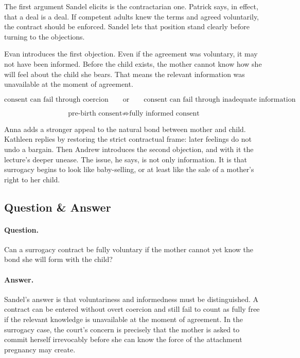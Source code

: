 The first argument Sandel elicits is the contractarian one. Patrick says, in effect, that a deal is a deal. If competent adults knew the terms and agreed voluntarily, the contract should be enforced. Sandel lets that position stand clearly before turning to the objections.

Evan introduces the first objection. Even if the agreement was voluntary, it may not have been informed. Before the child exists, the mother cannot know how she will feel about the child she bears. That means the relevant information was unavailable at the moment of agreement.

\begin{equation}
\text{consent can fail through coercion}
\qquad \text{or} \qquad
\text{consent can fail through inadequate information}
\end{equation}

\begin{equation}
\text{pre-birth consent} \not\Rightarrow \text{fully informed consent}
\end{equation}

Anna adds a stronger appeal to the natural bond between mother and child. Kathleen replies by restoring the strict contractual frame: later feelings do not undo a bargain. Then Andrew introduces the second objection, and with it the lecture's deeper unease. The issue, he says, is not only information. It is that surrogacy begins to look like baby-selling, or at least like the sale of a mother's right to her child.

\subsection{Question \& Answer}

\paragraph{Question.} Can a surrogacy contract be fully voluntary if the mother cannot yet know the bond she will form with the child?

\paragraph{Answer.} Sandel's answer is that voluntariness and informedness must be distinguished. A contract can be entered without overt coercion and still fail to count as fully free if the relevant knowledge is unavailable at the moment of agreement. In the surrogacy case, the court's concern is precisely that the mother is asked to commit herself irrevocably before she can know the force of the attachment pregnancy may create.

